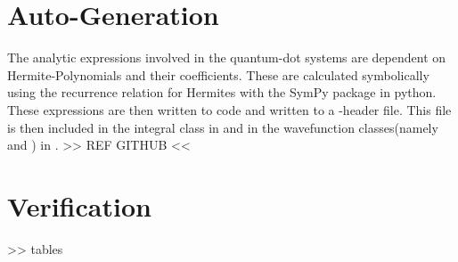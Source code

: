 \section{Auto-Generation\label{sec:auto_generation}}
    The analytic expressions involved in the quantum-dot systems are dependent
    on Hermite-Polynomials and their coefficients. These are calculated
    symbolically using the recurrence relation for Hermites with the SymPy
    package in python. These expressions are then written to \CC code and
    written to a \CC-header file. This file is then included in the integral
    class in  and in the wavefunction
    classes(namely  and ) in
    . >> REF GITHUB <<
\section{Verification\label{sec:verification}}

    >> tables
